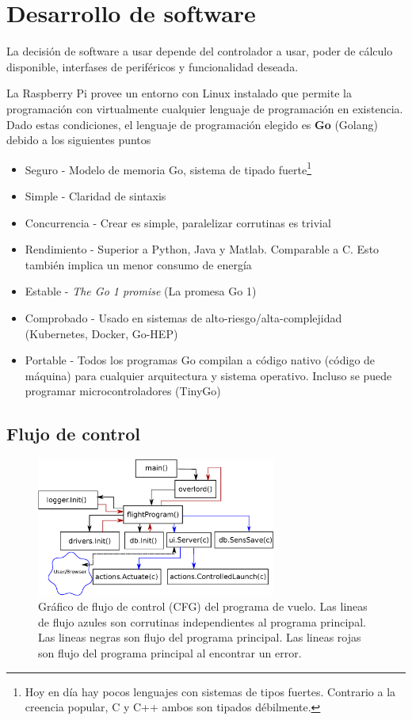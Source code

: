 \section{Desarrollo de software}

La decisión de software a usar depende del controlador a usar, poder de cálculo disponible, interfases de periféricos y funcionalidad deseada.

\medskip

La Raspberry Pi provee un entorno con Linux instalado que permite la programación con virtualmente cualquier lenguaje de programación en existencia. Dado estas condiciones, el lenguaje de programación elegido es \textbf{Go} (Golang) debido a los siguientes puntos

\begin{itemize}
    \item Seguro - Modelo de memoria Go, sistema de tipado fuerte\footnote{Hoy en día hay pocos lenguajes con sistemas de tipos fuertes. Contrario a la creencia popular, C y C++ ambos son tipados débilmente.}
    \item Simple - Claridad de sintaxis
    \item Concurrencia - Crear  es simple, paralelizar corrutinas es trivial
    \item Rendimiento - Superior a Python, Java y Matlab. Comparable a C. Esto también implica un menor consumo de energía
    \item Estable - \textit{The Go 1 promise} (La promesa Go 1)
    \item Comprobado -  Usado en sistemas de alto-riesgo/alta-complejidad (Kubernetes, Docker, Go-HEP)
    \item Portable - Todos los programas Go compilan a código nativo (código de máquina) para cualquier arquitectura y sistema operativo. Incluso se puede programar microcontroladores (TinyGo)
\end{itemize}

\subsection{Flujo de control}
\begin{figure}[!htb]
    \centering
    \includegraphics[width=0.7\textwidth]{fig/cfg_flightprogram.eps}
    \caption{Gráfico de flujo de control (CFG) del programa de vuelo. Las lineas de flujo azules son corrutinas independientes al programa principal. Las lineas negras son flujo del programa principal. Las lineas rojas son flujo del programa principal al encontrar un error.}
    \label{fig:flightProgram}
\end{figure}

